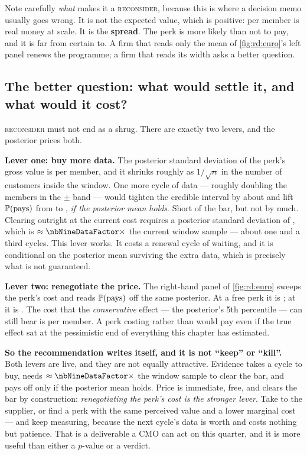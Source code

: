

Note carefully \emph{what} makes it a \textsc{reconsider}, because this is where a decision memo
usually goes wrong. It is not the expected value, which is positive: \eur{\nbNineNetMember} per
member is real money at scale. It is the \textbf{spread}. The perk is more likely than not to pay,
and it is far from certain to. A firm that reads only the mean of \cref{fig:rd:euro}'s left panel
renews the programme; a firm that reads its width asks a better question.

\subsection*{The better question: what would settle it, and what would it cost?}

\textsc{reconsider} must not end as a shrug. There are exactly two levers, and the posterior prices
both.

\textbf{Lever one: buy more data.} The posterior standard deviation of the perk's gross value is
\eur{\nbNineSdNow} per member, and it shrinks roughly as $1/\sqrt{n}$ in the number of customers
inside the window. One more cycle of data --- roughly doubling the \nbNineNWindow{} members in the
$\pm$\eur{\nbNineH} band --- would tighten the credible interval by about
\pc{\nbNineCriShrink} and lift $\operatorname{\mathbb{P}}(\text{pays})$ from \nbNinePPays{} to \nbNinePPaysNext{},
\emph{if the posterior mean holds}. Short of the bar, but not by much. Clearing
\nbNineActionBar{} outright at the current cost requires a posterior standard deviation of
\eur{\nbNineSdReq}, which is $\approx \nbNineDataFactor\times$ the current window sample --- about
one and a third cycles. This lever works. It costs a renewal cycle of waiting, and it is
conditional on the posterior mean surviving the extra data, which is precisely what is not
guaranteed.

\textbf{Lever two: renegotiate the price.} The right-hand panel of \cref{fig:rd:euro} sweeps the
perk's cost and reads $\operatorname{\mathbb{P}}(\text{pays})$ off the same posterior. At a free perk it is
\nbNinePPaysFree; at \eur{\nbNinePerkGridHi} it is \nbNinePPaysDear. The cost that the
\emph{conservative} effect --- the posterior's 5th percentile --- can still bear is
\eur{\nbNineBePerk} per member. A perk costing \eur{\nbNineBePerk} rather than
\eur{\nbNinePerkCost} would pay even if the true effect sat at the pessimistic end of everything
this chapter has estimated.

\textbf{So the recommendation writes itself, and it is not ``keep'' or ``kill''.} Both levers are
live, and they are not equally attractive. Evidence takes a cycle to buy, needs
$\approx \nbNineDataFactor\times$ the window sample to clear the bar, and pays off only if the
posterior mean holds. Price is immediate, free, and clears the bar by construction:
\emph{renegotiating the perk's cost is the stronger lever}. Take \eur{\nbNineBePerk} to the
supplier, or find a perk with the same perceived value and a lower marginal cost --- and keep
measuring, because the next cycle's data is worth \nbNinePPaysNext{} and costs nothing but patience.
That is a deliverable a CMO can act on this quarter, and it is more useful than either a $p$-value
or a verdict.

